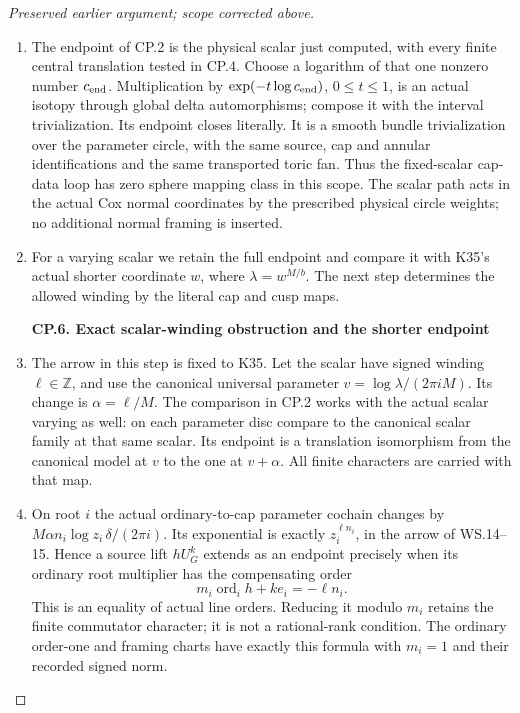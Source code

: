 \begin{proof}[Preserved earlier argument; scope corrected above]
\begin{enumerate}[label=\arabic*.]
\par

\medskip\noindent\textbf{CP.5. The actual fixed-scalar loop endpoint}

\par\nobreak

\item The endpoint of CP.2 is the physical scalar just computed, with every
finite central translation tested in CP.4. Choose a logarithm of
that one nonzero number \(c_{\rm end}\). Multiplication by
\(\exp(-t\log c_{\rm end})\), \(0\leq t\leq1\), is an actual
isotopy through global delta automorphisms; compose it with the
interval trivialization. Its endpoint closes literally. It is a
smooth bundle trivialization over the parameter circle, with the
same source, cap and annular identifications and the same transported
toric fan. Thus the fixed-scalar cap-data loop has zero sphere
mapping class in this scope. The scalar path acts in the actual
Cox normal coordinates by the prescribed physical circle weights;
no additional normal framing is inserted.

\item For a varying scalar we retain the full endpoint and compare it
with K35's actual shorter coordinate \(w\), where
\(\lambda=w^{M/b}\). The next step determines the allowed winding
by the literal cap and cusp maps.

\par

\medskip\noindent\textbf{CP.6. Exact scalar-winding obstruction and the shorter endpoint}

\par\nobreak

\item The arrow in this step is fixed to K35.
Let the scalar have signed winding \(\ell\in\mathbb Z\), and use
the canonical universal parameter
\(v=\log\lambda/(2\pi iM)\). Its change is
\(\alpha=\ell/M\). The comparison in CP.2 works with the actual
scalar varying as well: on each parameter disc compare to the
canonical scalar family at that same scalar. Its endpoint is a
translation isomorphism from the canonical model at \(v\) to the one
at \(v+\alpha\). All finite characters are carried with that map.

\item On root \(i\) the actual ordinary-to-cap parameter cochain changes by
\(M\alpha n_i\log z_i\,\delta/(2\pi i)\). Its exponential is
exactly \(z_i^{\ell n_i}\), in the arrow of WS.14--15. Hence a
source lift \(hU_G^k\) extends as an endpoint precisely when its
ordinary root multiplier has the compensating order
\[
             m_i\operatorname{ord}_i h+k e_i=-\ell n_i.
                                                               \tag{CP.7}
\]
This is an equality of actual line orders. Reducing it modulo \(m_i\)
retains the finite commutator character; it is not a rational-rank
condition. The ordinary order-one and framing charts have exactly
this formula with \(m_i=1\) and their recorded signed norm.


\end{enumerate}
\end{proof}
